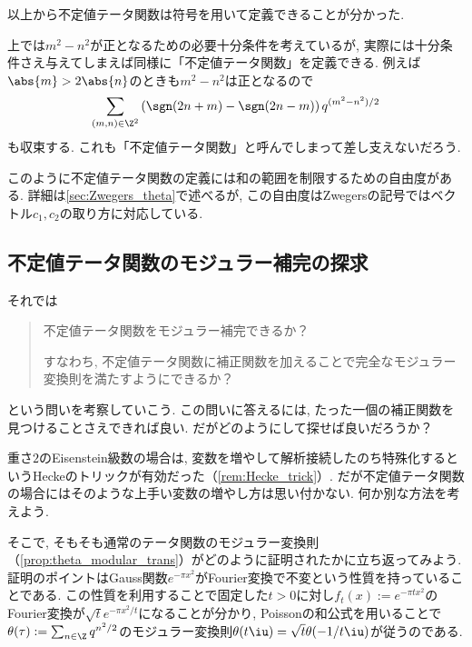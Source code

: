\documentclass[11pt,b5paper,oneside,lualatex]{ltjsarticle} %
\numberwithin{equation}{section} %
\begin{document}
以上から不定値テータ関数は符号を用いて定義できることが分かった. 

\begin{rem} \label{rem:indef_ambiguity}
	上では$ m^2 - n^2 $が正となるための必要十分条件を考えているが, 実際には十分条件さえ与えてしまえば同様に「不定値テータ関数」を定義できる. 
	例えば$ \abs{m} > 2\abs{n} $のときも$ m^2 - n^2 $は正となるので
	\[
	\sum_{(m, n) \in \Z^2} \left( \sgn(2n+m) - \sgn(2n-m) \right) q^{(m^2 - n^2)/2}
	\]
	も収束する. 
	これも「不定値テータ関数」と呼んでしまって差し支えないだろう. 
	
	このように不定値テータ関数の定義には和の範囲を制限するための自由度がある. 
	詳細は\cref{sec:Zwegers_theta}で述べるが, この自由度はZwegersの記号ではベクトル$ c_1, c_2 $の取り方に対応している. 
\end{rem}



\subsection{不定値テータ関数のモジュラー補完の探求} \label{subsec:modular_completion}


それでは
\begin{quote}
	\centering
	不定値テータ関数をモジュラー補完できるか？
	
	すなわち, 不定値テータ関数に補正関数を加えることで完全なモジュラー変換則を満たすようにできるか？
\end{quote}
という問いを考察していこう. 
この問いに答えるには, たった一個の補正関数を見つけることさえできれば良い. 
だがどのようにして探せば良いだろうか？

重さ$ 2 $のEisenstein級数の場合は, 変数を増やして解析接続したのち特殊化するというHeckeのトリックが有効だった（\cref{rem:Hecke_trick}）. 
だが不定値テータ関数の場合にはそのような上手い変数の増やし方は思い付かない. 
何か別な方法を考えよう. 

そこで, そもそも通常のテータ関数のモジュラー変換則（\cref{prop:theta_modular_trans}）がどのように証明されたかに立ち返ってみよう. 
証明のポイントはGauss関数$ e^{-\pi x^2} $がFourier変換で不変という性質を持っていることである. 
この性質を利用することで固定した$ t > 0 $に対し$ f_t (x) := e^{-\pi t x^2} $のFourier変換が$ \sqrt{t} e^{-\pi  x^2/t} $になることが分かり, Poissonの和公式を用いることで$ \theta (\tau) := \sum_{n \in \Z} q^{n^2/2} $のモジュラー変換則$ \theta (t\iu) = \sqrt{t} \theta (-1/t\iu) $が従うのである. 
\end{document}
